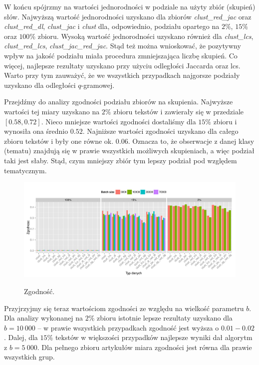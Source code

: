 \documentclass{praca1}
\begin{document}
W końcu spójrzmy na wartości jednorodności w podziale na użyty zbiór (skupień) słów. Najwyższą wartość jednorodności uzyskano dla zbiorów \emph{clust\_red\_jac} oraz \emph{clust\_red\_dl}, \emph{clust\_jac} i \emph{clust} dla, odpowiednio, podziału opartego na $2\%$, $15\%$ oraz $100\%$ zbioru. Wysoką wartość jednorodności uzyskano również dla \emph{clust\_lcs}, \emph{clust\_red\_lcs}, \emph{clust\_jac\_red\_jac}. Stąd też można wnioskować, że pozytywny wpływ na jakość podziału miała procedura zmniejszająca liczbę skupień. Co więcej, najlepsze rezultaty uzyskano przy użyciu odległości Jaccarda oraz lcs. Warto przy tym zauważyć, że we wszystkich przypadkach najgorsze podziały uzyskano dla odległości $q$-gramowej.

Przejdźmy do analizy zgodności podziału zbiorów na skupienia. Najwyższe wartości tej miary uzyskano na $2\%$ zbioru tekstów i zawierały się w przedziale $[0.58, 0.72]$. Nieco mniejsze wartości zgodności dostaliśmy dla $15\%$ zbioru i wynosiła ona średnio $0.52$. Najniższe wartości zgodności uzyskano dla całego zbioru tekstów i były one równe ok. $0.06$. Oznacza to, że obserwacje z danej klasy (tematu) znajdują się w prawie wszystkich możliwych skupieniach, a więc podział taki jest słaby. Stąd, czym mniejszy zbiór tym lepszy podział pod względem tematycznym.

\begin{figure}[!h]
  \centering
  \includegraphics[width=400pt]{plot11.pdf}\\
  \caption{Zgodność.}\label{plot:006}
\end{figure}

Przyjrzyjmy się teraz wartościom zgodności ze względu na wielkość parametru $b$. Dla analizy wykonanej na $2\%$ zbioru istotnie lepsze rezultaty uzyskano dla $b = 10\ 000$ -- w prawie wszystkich przypadkach zgodność jest wyższa o $0.01-0.02$. Dalej, dla $15\%$ tekstów w większości przypadków najlepsze wyniki dał algorytm z $b = 5\ 000$. Dla pełnego zbioru artykułów miara zgodności jest równa dla prawie wszystkich grup.
\end{document}
